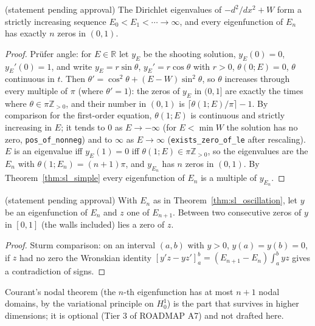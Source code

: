 \begin{theorem}
  \label{thm:sl_oscillation}
  (statement pending approval)
  The Dirichlet eigenvalues of $-d^2/dx^2+W$ form a strictly increasing sequence $E_0<E_1<\cdots\to\infty$, and every
  eigenfunction of $E_n$ has exactly $n$ zeros in $(0,1)$.
\end{theorem}
\begin{proof}
  Prüfer angle: for $E\in\mathbb R$ let $y_E$ be the shooting solution, $y_E(0)=0$, $y_E'(0)=1$, and write
  $y_E=r\sin\theta$, $y_E'=r\cos\theta$ with $r>0$, $\theta(0;E)=0$, $\theta$ continuous in $t$. Then
  $\theta'=\cos^2\theta+(E-W)\sin^2\theta$, so $\theta$ increases through every multiple of $\pi$ (where $\theta'=1$):
  the zeros of $y_E$ in $(0,1]$ are exactly the times where $\theta\in\pi\mathbb Z_{>0}$, and their number in $(0,1)$ is
  $\lceil\theta(1;E)/\pi\rceil-1$. By comparison for the first-order equation, $\theta(1;E)$ is continuous and strictly
  increasing in $E$; it tends to $0$ as $E\to-\infty$ (for $E<\min W$ the solution has no zero,
  \texttt{pos\_of\_nonneg}) and to $\infty$ as $E\to\infty$ (\texttt{exists\_zero\_of\_le} after rescaling). $E$ is an
  eigenvalue iff $y_E(1)=0$ iff $\theta(1;E)\in\pi\mathbb Z_{>0}$, so the eigenvalues are the $E_n$ with
  $\theta(1;E_n)=(n+1)\pi$, and $y_{E_n}$ has $n$ zeros in $(0,1)$. By Theorem~\ref{thm:sl_simple} every eigenfunction of
  $E_n$ is a multiple of $y_{E_n}$.
\end{proof}

\begin{theorem}
  \label{thm:sl_interlace}
  (statement pending approval)
  With $E_n$ as in Theorem~\ref{thm:sl_oscillation}, let $y$ be an eigenfunction of $E_n$ and $z$ one of $E_{n+1}$.
  Between two consecutive zeros of $y$ in $[0,1]$ (the walls included) lies a zero of $z$.
\end{theorem}
\begin{proof}
  Sturm comparison: on an interval $(a,b)$ with $y>0$, $y(a)=y(b)=0$, if $z$ had no zero the Wronskian identity
  $[y'z-yz']_a^b=(E_{n+1}-E_n)\int_a^byz$ gives a contradiction of signs.
\end{proof}

Courant's nodal theorem (the $n$-th eigenfunction has at most $n+1$ nodal domains, by the variational principle on
$H^1_0$) is the part that survives in higher dimensions; it is optional (Tier 3 of ROADMAP A7) and not drafted here.
